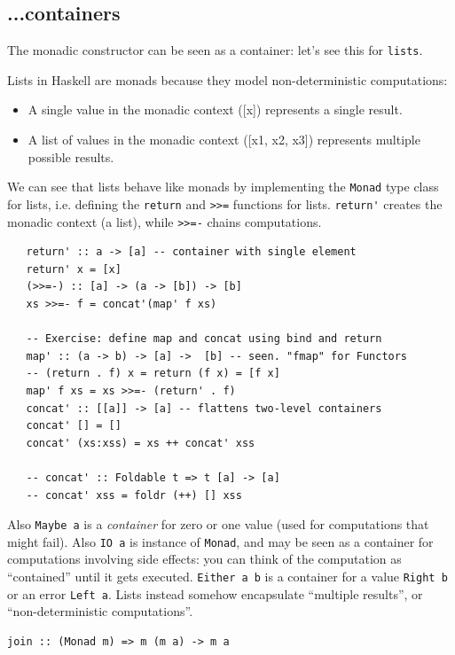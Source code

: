 \subsection{...containers}

The monadic constructor can be seen as a container:
let’s see this for \lstinline|lists|.
{Lists in Haskell are monads because they model non-deterministic computations:\ns
\begin{itemize}
	\item A single value in the monadic context ([x]) represents a single result.
	\item A list of values in the monadic context ([x1, x2, x3]) represents multiple possible results.
\end{itemize}}
We can see that lists behave like monads by implementing the \lstinline|Monad| type class for lists, i.e. defining the \lstinline|return| and \lstinline|>>=| functions for lists.
\lstinline|return'| creates the monadic context (a list), while \lstinline|>>=-| chains computations.


\begin{lstlisting}
   return' :: a -> [a] -- container with single element
   return' x = [x]
   (>>=-) :: [a] -> (a -> [b]) -> [b]
   xs >>=- f = concat'(map' f xs)
   
   -- Exercise: define map and concat using bind and return
   map' :: (a -> b) -> [a] ->  [b] -- seen. "fmap" for Functors
   -- (return . f) x = return (f x) = [f x]
   map' f xs = xs >>=- (return' . f)
   concat' :: [[a]] -> [a] -- flattens two-level containers
   concat' [] = []
   concat' (xs:xss) = xs ++ concat' xss
   
   -- concat' :: Foldable t => t [a] -> [a]
   -- concat' xss = foldr (++) [] xss
\end{lstlisting}

Also \lstinline|Maybe a| is a \textit{container} for zero or one value (used for computations that might fail).
Also \lstinline|IO a| is instance of \lstinline|Monad|, and may be seen as a container for computations involving side effects: you can think of the computation as ``contained'' until it gets executed.
\lstinline|Either a b| is a container for a value \lstinline|Right b| or an error \lstinline|Left a|.
Lists instead somehow encapsulate ``multiple results'', or ``non-deterministic computations''.

\begin{lstlisting}[caption={\textit{``If I have a box of boxes of apples\lstinline| (m (m a))| then I can take the apples from each, and put them in a new box \lstinline|(m a)|.''} }]
   join :: (Monad m) => m (m a) -> m a
\end{lstlisting}

